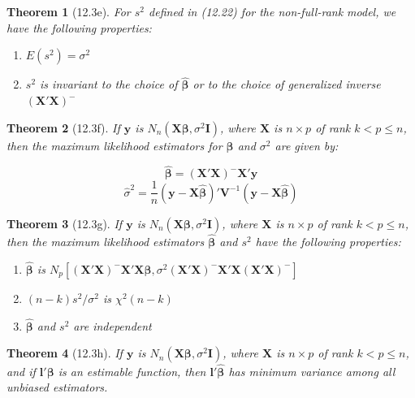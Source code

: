 \documentclass{article}
\newtheorem{theorem}{Theorem}[section]
\begin{document}
\begin{theorem}[12.3e]
For $s^2$ defined in (12.22) for the non-full-rank model, we have the following properties:

\begin{enumerate}[label=(\roman*)]
\item $E(s^2) = \sigma^2$
\item $s^2$ is invariant to the choice of $\hat{\boldsymbol{\beta}}$ or to the choice of generalized inverse $(\mathbf{X}'\mathbf{X})^{-}$
\end{enumerate}
\end{theorem}

\begin{theorem}[12.3f]
If $\mathbf{y}$ is $N_n(\mathbf{X}\boldsymbol{\beta}, \sigma^2\mathbf{I})$, where $\mathbf{X}$ is $n \times p$ of rank $k < p \leq n$, then the maximum likelihood estimators for $\boldsymbol{\beta}$ and $\sigma^2$ are given by:

\[\hat{\boldsymbol{\beta}} = (\mathbf{X}'\mathbf{X})^{-}\mathbf{X}'\mathbf{y}\]
\[\hat{\sigma}^2 = \frac{1}{n}(\mathbf{y} - \mathbf{X}\hat{\boldsymbol{\beta}})'\mathbf{V}^{-1}(\mathbf{y} - \mathbf{X}\hat{\boldsymbol{\beta}})\]
\end{theorem}

\begin{theorem}[12.3g]
If $\mathbf{y}$ is $N_n(\mathbf{X}\boldsymbol{\beta}, \sigma^2\mathbf{I})$, where $\mathbf{X}$ is $n \times p$ of rank $k < p \leq n$, then the maximum likelihood estimators $\hat{\boldsymbol{\beta}}$ and $s^2$ have the following properties:

\begin{enumerate}[label=(\roman*)]
\item $\hat{\boldsymbol{\beta}}$ is $N_p[(\mathbf{X}'\mathbf{X})^{-}\mathbf{X}'\mathbf{X}\boldsymbol{\beta}, \sigma^2(\mathbf{X}'\mathbf{X})^{-}\mathbf{X}'\mathbf{X}(\mathbf{X}'\mathbf{X})^{-}]$
\item $(n-k)s^2/\sigma^2$ is $\chi^2(n-k)$
\item $\hat{\boldsymbol{\beta}}$ and $s^2$ are independent
\end{enumerate}
\end{theorem}

\begin{theorem}[12.3h]
If $\mathbf{y}$ is $N_n(\mathbf{X}\boldsymbol{\beta}, \sigma^2\mathbf{I})$, where $\mathbf{X}$ is $n \times p$ of rank $k < p \leq n$, and if $\mathbf{l}'\boldsymbol{\beta}$ is an estimable function, then $\mathbf{l}'\hat{\boldsymbol{\beta}}$ has minimum variance among all unbiased estimators.
\end{theorem}
\end{document}
